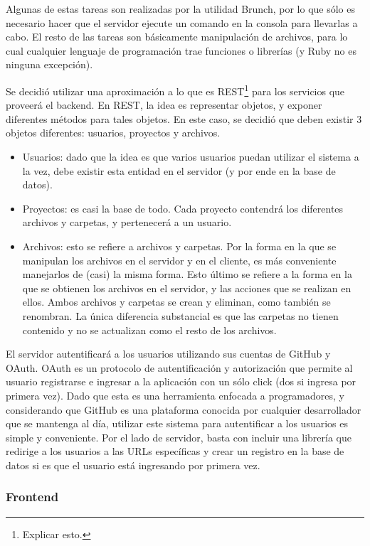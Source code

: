 \documentclass[12pt,titlepage,]{article}
\begin{document}
Algunas de estas tareas son realizadas por la utilidad Brunch, por lo
que sólo es necesario hacer que el servidor ejecute un comando en la
consola para llevarlas a cabo. El resto de las tareas son básicamente
manipulación de archivos, para lo cual cualquier lenguaje de
programación trae funciones o librerías (y Ruby no es ninguna
excepción).

Se decidió utilizar una aproximación a lo que es REST\footnote{Explicar
  esto.} para los servicios que proveerá el backend. En REST, la idea es
representar objetos, y exponer diferentes métodos para tales objetos. En
este caso, se decidió que deben existir 3 objetos diferentes: usuarios,
proyectos y archivos.

\begin{itemize}
\item
  Usuarios: dado que la idea es que varios usuarios puedan utilizar el
  sistema a la vez, debe existir esta entidad en el servidor (y por ende
  en la base de datos).
\item
  Proyectos: es casi la base de todo. Cada proyecto contendrá los
  diferentes archivos y carpetas, y pertenecerá a un usuario.
\item
  Archivos: esto se refiere a archivos y carpetas. Por la forma en la
  que se manipulan los archivos en el servidor y en el cliente, es más
  conveniente manejarlos de (casi) la misma forma. Esto último se
  refiere a la forma en la que se obtienen los archivos en el servidor,
  y las acciones que se realizan en ellos. Ambos archivos y carpetas se
  crean y eliminan, como también se renombran. La única diferencia
  substancial es que las carpetas no tienen contenido y no se actualizan
  como el resto de los archivos.
\end{itemize}

El servidor autentificará a los usuarios utilizando sus cuentas de
GitHub y OAuth. OAuth es un protocolo de autentificación y autorización
que permite al usuario registrarse e ingresar a la aplicación con un
sólo click (dos si ingresa por primera vez). Dado que esta es una
herramienta enfocada a programadores, y considerando que GitHub es una
plataforma conocida por cualquier desarrollador que se mantenga al día,
utilizar este sistema para autentificar a los usuarios es simple y
conveniente. Por el lado de servidor, basta con incluir una librería que
redirige a los usuarios a las URLs específicas y crear un registro en la
base de datos si es que el usuario está ingresando por primera vez.

\subsubsection{Frontend}
\end{document}
